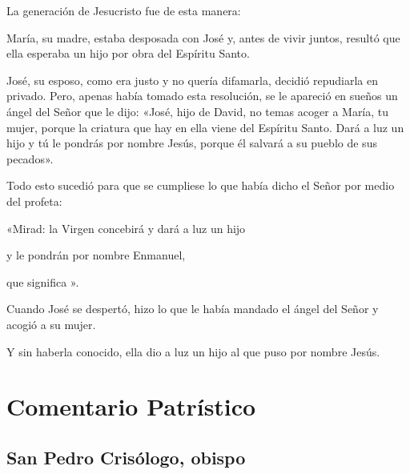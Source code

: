 
		 

		
		\begin{scripture}
			La generación de Jesucristo fue de esta manera:
			
			María, su madre, estaba desposada con José y, antes de vivir juntos, resultó que ella esperaba un hijo por obra del Espíritu Santo.
			
			José, su esposo, como era justo y no quería difamarla, decidió repudiarla en privado. Pero, apenas había tomado esta resolución, se le apareció en sueños un ángel del Señor que le dijo: «José, hijo de David, no temas acoger a María, tu mujer, porque la criatura que hay en ella viene del Espíritu Santo. Dará a luz un hijo y tú le pondrás por nombre Jesús, porque él salvará a su pueblo de sus pecados».
			
			Todo esto sucedió para que se cumpliese lo que había dicho el Señor por medio del profeta:
			
			«Mirad: la Virgen concebirá y dará a luz un hijo
			
			y le pondrán por nombre Enmanuel,
			
			que significa ».
			
			Cuando José se despertó, hizo lo que le había mandado el ángel del Señor y acogió a su mujer.
			
			Y sin haberla conocido, ella dio a luz un hijo al que puso por nombre Jesús.
		\end{scripture}
	
	\newsection

	\section{Comentario Patrístico}

		\subsection{San Pedro Crisólogo, obispo}


			
